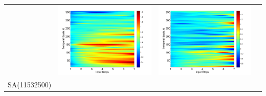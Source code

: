 \documentclass[review]{elsarticle}
\begin{document}
\begin{table}[H]
\begin{tabular}{cccc}
&\begin{minipage}{.3\textwidth}\includegraphics[width=\linewidth]{resultgraph/05585000diff_ep.png}\end{minipage}
&\begin{minipage}{.3\textwidth}\includegraphics[width=\linewidth]{resultgraph/05585000diff_q.png}\end{minipage}
\\
SA(11532500)

\end{tabular}
\end{table}
\end{document}
